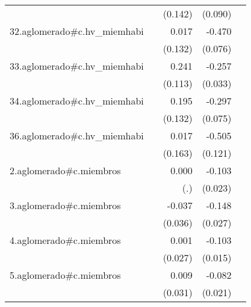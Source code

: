 {\begin{longtable}{l*{4}{D{.}{.}{-1}}}
            &                     &     (0.142)         &     (0.090)         &                     \\
\addlinespace
32.aglomerado#c.hv\_miemhabi&                     &       0.017         &      -0.470\sym{***}&                     \\
            &                     &     (0.132)         &     (0.076)         &                     \\
\addlinespace
33.aglomerado#c.hv\_miemhabi&                     &       0.241\sym{*}  &      -0.257\sym{***}&                     \\
            &                     &     (0.113)         &     (0.033)         &                     \\
\addlinespace
34.aglomerado#c.hv\_miemhabi&                     &       0.195         &      -0.297\sym{***}&                     \\
            &                     &     (0.132)         &     (0.075)         &                     \\
\addlinespace
36.aglomerado#c.hv\_miemhabi&                     &       0.017         &      -0.505\sym{***}&                     \\
            &                     &     (0.163)         &     (0.121)         &                     \\
\addlinespace
2.aglomerado#c.miembros&                     &       0.000         &      -0.103\sym{***}&                     \\
            &                     &         (.)         &     (0.023)         &                     \\
\addlinespace
3.aglomerado#c.miembros&                     &      -0.037         &      -0.148\sym{***}&                     \\
            &                     &     (0.036)         &     (0.027)         &                     \\
\addlinespace
4.aglomerado#c.miembros&                     &       0.001         &      -0.103\sym{***}&                     \\
            &                     &     (0.027)         &     (0.015)         &                     \\
\addlinespace
5.aglomerado#c.miembros&                     &       0.009         &      -0.082\sym{***}&                     \\
            &                     &     (0.031)         &     (0.021)         &                     \\

\end{longtable}}

